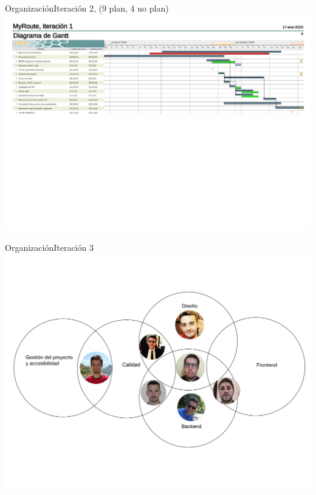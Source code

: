 \documentclass{beamer}
\begin{document}
\begin{frame}{Organizaci\'on}{Iteraci\'on 2, (9 plan, 4 no plan)}
\includegraphics[scale=0.1]{images_latex/gantt_itr2}
\end{frame}



\begin{frame}{Organizaci\'on}{Iteraci\'on 3}
\includegraphics[scale=0.1]{images_latex/org_itr3}
\end{frame}
\end{document}
